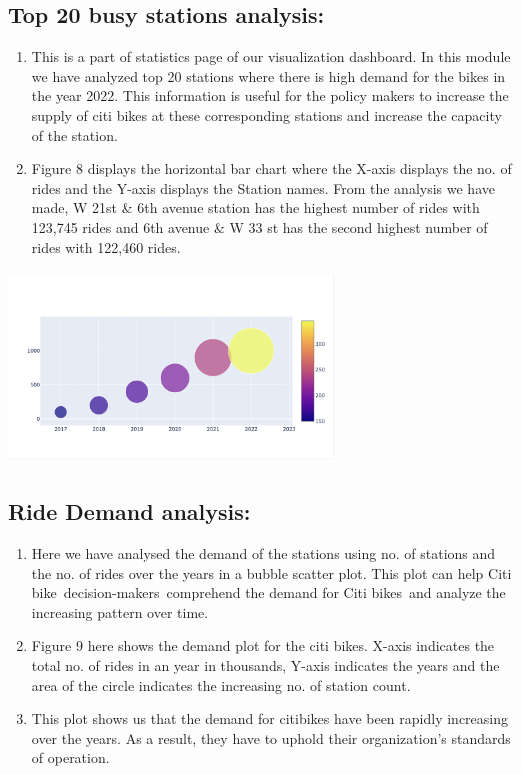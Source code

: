 \documentclass[journal]{vgtc}                     %
\begin{document}
\subsection{Top 20 busy stations analysis:}
\begin{enumerate}
\item This is a part of statistics page of our visualization dashboard. In this module we have analyzed top 20 stations where there is high demand for the bikes in the year 2022. This information is useful for the policy makers to increase the supply of citi bikes at these corresponding stations and increase the capacity of the station.
\item Figure 8 displays the horizontal bar chart where the X-axis displays the no. of rides and the Y-axis displays the Station names. From the analysis we have made, W 21st \& 6th avenue station has the highest number of rides with 123,745 rides and 6th avenue \& W 33 st has the second highest number of rides with 122,460 rides.
\end{enumerate}
\parbox{\linewidth}{
        \includegraphics[width=3.4in, height=2in]{figs/demand.png}\\
        }
\subsection{Ride Demand analysis:}
\begin{enumerate}
\item Here we have analysed the demand of the stations using no. of stations and the no. of rides over the years in a bubble scatter plot. This plot can help Citi bike decision-makers comprehend the demand for Citi bikes and analyze the increasing pattern over time.
\item Figure 9 here shows the demand plot for the citi bikes. X-axis indicates the total no. of rides in an year in thousands, Y-axis indicates the years and the area of the circle indicates the increasing no. of station count. 
\item This plot shows us that the demand for citibikes have been rapidly increasing over the years. As a result, they have to uphold their organization's standards of operation.
\end{enumerate}
\end{document}
